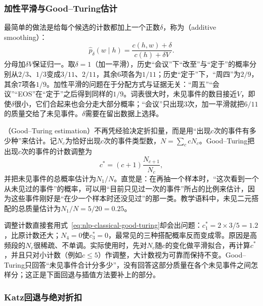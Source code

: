 \subsubsection{加性平滑与Good--Turing估计}
\label{sec:nlp-classical-additive-gt}

最简单的做法是给每个候选的计数都加上一个正数$\delta$，称为（additive smoothing）：
\begin{equation}
  \hat p_{\delta}(w\mid h)=\frac{c(h,w)+\delta}{c(h)+\delta V}.
  \label{eq:nlp-classical-additive}
\end{equation}
分母加$\delta V$保证归一。取$\delta=1$（加一平滑），历史“会议”下“改至”与“定于”的概率分别从$2/3$、$1/3$变成$3/11$、$2/11$，其余6项各为$1/11$；历史“定于”下，“周四”为$2/9$，其余7项各$1/9$。加性平滑的问题在于分配方式与证据无关：“周五”“会议”“EOS”在“定于”之后得到同样的$1/9$。词表很大时，未见事件的数目接近$V$，即使$\delta$很小，它们合起来也会分走大部分概率；“会议”只出现3次，加一平滑就把$6/11$的质量交给了未见事件。$\delta$需要在留出数据上选择。

（Good--Turing estimation）不再凭经验决定折扣量，而是用“出现$c$次的事件有多少种”来估计。记$N_c$为恰好出现$c$次的事件类型数，$N=\sum_c cN_c$。Good--Turing把出现$c$次的事件的计数调整为
\begin{equation}
  c^{*}=(c+1)\frac{N_{c+1}}{N_c},
  \label{eq:nlp-classical-good-turing}
\end{equation}
并把未见事件的总概率估计为$N_1/N$。直觉是：在再抽一个样本时，“这次看到一个从未见过的事件”的概率，可以用“目前只见过一次的事件”所占的比例来估计，因为这些事件刚好是“在少一个样本时还没见过”的那一类。教学语料中，未见二元搭配的总质量估计为$N_1/N=5/20=0.25$。

调整计数直接套用式~\eqref{eq:nlp-classical-good-turing}却会出问题：$c^*_1=2\times3/5=1.2$，比原计数还大；$N_4=0$使$c^*_3=0$，最常见的三种搭配概率反而变成零。原因是高频段的$N_c$很稀疏、不单调。实际使用时，先对$N_c$随$c$的变化做平滑拟合，再计算$c^*$，并且只对小计数（例如$c\leq5$）作调整，大计数视为可靠而保持不变。Good--Turing只回答“未见事件合计分多少”，没有回答这部分质量在各个未见事件之间怎样分；这正是下面回退与插值方法要补上的部分。

\subsubsection{Katz回退与绝对折扣}
\label{sec:nlp-classical-katz-absolute}

